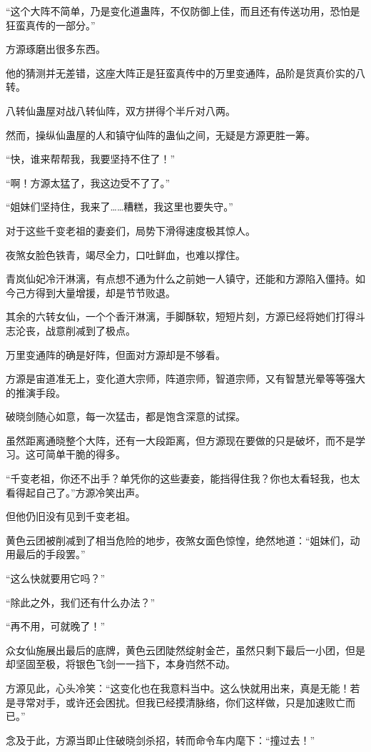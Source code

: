 \begin{this_body}
“这个大阵不简单，乃是变化道蛊阵，不仅防御上佳，而且还有传送功用，恐怕是狂蛮真传的一部分。”

方源琢磨出很多东西。

他的猜测并无差错，这座大阵正是狂蛮真传中的万里变通阵，品阶是货真价实的八转。

八转仙蛊屋对战八转仙阵，双方拼得个半斤对八两。

然而，操纵仙蛊屋的人和镇守仙阵的蛊仙之间，无疑是方源更胜一筹。

“快，谁来帮帮我，我要坚持不住了！”

“啊！方源太猛了，我这边受不了了。”

“姐妹们坚持住，我来了……糟糕，我这里也要失守。”

对于这些千变老祖的妻妾们，局势下滑得速度极其惊人。

夜煞女脸色铁青，竭尽全力，口吐鲜血，也难以撑住。

青岚仙妃冷汗淋漓，有点想不通为什么之前她一人镇守，还能和方源陷入僵持。如今己方得到大量增援，却是节节败退。

其余的六转女仙，一个个香汗淋漓，手脚酥软，短短片刻，方源已经将她们打得斗志沦丧，战意削减到了极点。

万里变通阵的确是好阵，但面对方源却是不够看。

方源是宙道准无上，变化道大宗师，阵道宗师，智道宗师，又有智慧光晕等等强大的推演手段。

破晓剑随心如意，每一次猛击，都是饱含深意的试探。

虽然距离通晓整个大阵，还有一大段距离，但方源现在要做的只是破坏，而不是学习。这可简单干脆的得多。

“千变老祖，你还不出手？单凭你的这些妻妾，能挡得住我？你也太看轻我，也太看得起自己了。”方源冷笑出声。

但他仍旧没有见到千变老祖。

黄色云团被削减到了相当危险的地步，夜煞女面色惊惶，绝然地道：“姐妹们，动用最后的手段罢。”

“这么快就要用它吗？”

“除此之外，我们还有什么办法？”

“再不用，可就晚了！”

众女仙施展出最后的底牌，黄色云团陡然绽射金芒，虽然只剩下最后一小团，但是却坚固至极，将银色飞剑一一挡下，本身岿然不动。

方源见此，心头冷笑：“这变化也在我意料当中。这么快就用出来，真是无能！若是寻常对手，或许还会困扰。但我已经摸清脉络，你们这样做，只是加速败亡而已。”

念及于此，方源当即止住破晓剑杀招，转而命令车内麾下：“撞过去！”


\end{this_body}
